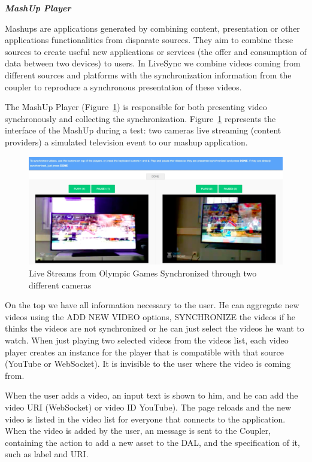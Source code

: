 \documentclass[sigconf]{acmart}
\begin{document}
\textbf{\textit{MashUp Player}}

Mashups are applications generated by combining content, presentation or other applications functionalities from disparate sources. They aim to combine these sources to create useful new applications or services (the offer and consumption of data between two devices) to users. In LiveSync we combine videos coming from different sources and platforms with the synchronization information from the coupler to reproduce a synchronous presentation of these videos.

The MashUp Player (Figure~\ref{live_tvs}) is responsible for both presenting video synchronously and collecting the synchronization. Figure~\ref{live_tvs} represents the interface of the MashUp during a test: two cameras live streaming (content providers) a simulated television event to our mashup application.

\begin{figure}[h]
	\centerline{\includegraphics[scale=0.2] {figures/screen}}
	\caption{Live Streams from Olympic Games Synchronized through two different cameras}
	\label{live_tvs}
\end{figure}

On the top we have all information necessary to the user. He can aggregate new videos using the ADD NEW VIDEO options, SYNCHRONIZE the videos if he thinks the videos are not synchronized or he can just select the videos he want to watch. When just playing two selected videos from the videos list, each video player creates an instance for the player that is compatible with that source (YouTube or WebSocket). It is invisible to the user where the video is coming from.

When the user adds a video, an input text is shown to him, and he can add the video URI (WebSocket) or video ID YouTube). The page reloads and the new video is listed in the video list for everyone that connects to the application. When the video is added by the user, an message is sent to the Coupler, containing the action to add a new asset to the DAL, and the specification of it, such as label and URI.
\end{document}
